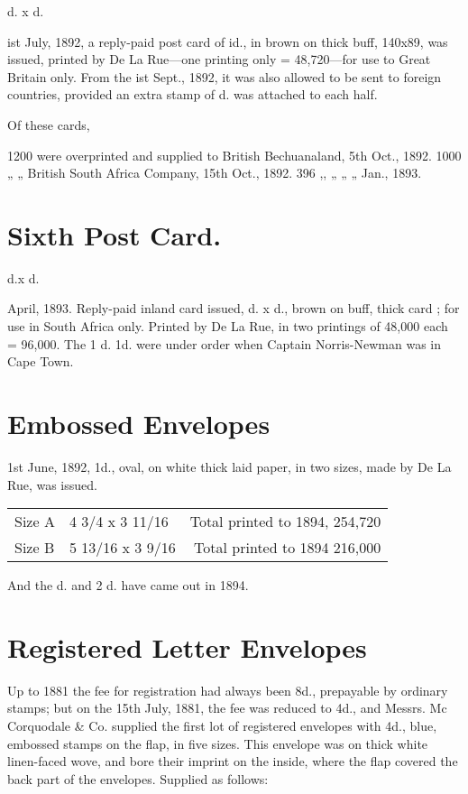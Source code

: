 \half d. x \half d.

ist July, 1892, a reply-paid post card of id., in brown on thick buff,
140x89, was issued, printed by De La Rue---one printing only = 48,720---for
use to Great Britain only. From the ist Sept., 1892, it was also allowed to
be sent to foreign countries, provided an extra stamp of \half d. was attached
to each half.

Of these cards,

1200 were overprinted and supplied to British Bechuanaland, 5th Oct., 1892.
1000 „ „ British South Africa Company, 15th Oct., 1892.
396 ,, „ „ „ Jan., 1893.

\section{Sixth Post Card.}

\half d.x \half d.

April, 1893. Reply-paid inland card issued, \half d. x \half d., brown on buff, thick
card ; for use in South Africa only. Printed by De La Rue, in two printings
of 48,000 each = 96,000. The 1 \half d. 1\half d. were under order when Captain Norris-Newman was in Cape Town.

\section{Embossed Envelopes}

1st June, 1892, 1d., oval, on white thick laid paper, in two sizes, made by
De La Rue, was issued.

\begin{tabular}{llr}
Size A  &4 3/4 x 3 11/16 &Total printed to 1894, 254,720\\
Size  B &5 13/16 x 3 9/16 &Total printed to 1894  216,000\\
\end{tabular}

And the \half d. and 2 \half d. have came out in 1894.


\section{Registered Letter Envelopes}

Up to 1881 the fee for registration had always been 8d., prepayable by
ordinary stamps; but on the 15th July, 1881, the fee was reduced to 4d., and
Messrs. Mc Corquodale & Co. supplied the first lot of registered envelopes
with 4d., blue, embossed stamps on the flap, in five sizes. This envelope was
on thick white linen-faced wove, and bore their imprint on the inside, where
the flap covered the back part of the envelopes. Supplied as follows:

